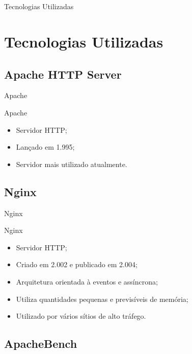 \section*{}
\begin{frame}
	\centering
	{\Huge Tecnologias Utilizadas}
\end{frame}

\section{Tecnologias Utilizadas}\label{sec:tecnologias-utilizadas}

\subsection*{Apache HTTP Server }

\begin{frame}{Apache}
	\begin{block}{Apache}
	\begin{itemize}
		\item Servidor HTTP;
		\item Lançado em 1.995;
		\item Servidor mais utilizado atualmente.
	\end{itemize}
\end{block}
\end{frame}

\subsection*{Nginx}

\begin{frame}{Nginx}
	\begin{block}{Nginx}
	\begin{itemize}
		\item Servidor HTTP;
		\item Criado em 2.002 e publicado em 2.004;
		\item Arquitetura orientada à eventos e assíncrona;
		\item Utiliza quantidades pequenas e previsíveis de memória;
		\item Utilizado por vários sítios de alto tráfego.
	\end{itemize}
\end{block}
\end{frame}

\subsection*{ApacheBench}


